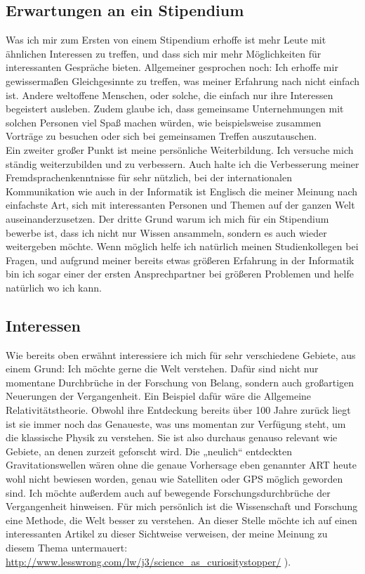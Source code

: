 \documentclass{scrartcl}
\begin{document}
\subsection*{Erwartungen an ein Stipendium}
Was ich mir zum Ersten von einem Stipendium erhoffe ist mehr Leute mit ähnlichen Interessen zu
treffen, und dass sich mir mehr Möglichkeiten für interessanten Gespräche bieten. Allgemeiner
gesprochen noch: Ich erhoffe mir gewissermaßen Gleichgesinnte zu treffen, was meiner Erfahrung
nach nicht einfach ist. Andere weltoffene Menschen, oder solche, die einfach nur ihre Interessen
begeistert ausleben. Zudem glaube ich, dass gemeinsame Unternehmungen mit solchen Personen viel
Spaß machen würden, wie beispielsweise zusammen Vorträge zu besuchen oder sich bei gemeinsamen
Treffen auszutauschen. \\ Ein zweiter großer Punkt ist meine persönliche Weiterbildung. Ich versuche
mich ständig weiterzubilden und zu verbessern.
Auch halte ich die Verbesserung meiner Fremdsprachenkenntnisse für sehr nützlich,
bei der internationalen Kommunikation wie auch in der Informatik ist Englisch die meiner Meinung
nach einfachste Art, sich mit interessanten Personen und Themen auf der ganzen Welt auseinanderzusetzen.
Der dritte Grund warum ich mich für ein Stipendium bewerbe ist, dass ich nicht nur Wissen
ansammeln, sondern es auch wieder weitergeben möchte. Wenn möglich helfe ich natürlich meinen
Studienkollegen bei Fragen, und aufgrund meiner bereits etwas größeren Erfahrung in der Informatik
bin ich sogar einer der ersten Ansprechpartner bei größeren Problemen und helfe natürlich wo ich kann.

\subsection*{Interessen}
Wie bereits oben erwähnt interessiere ich mich für sehr verschiedene Gebiete, aus einem Grund:
Ich möchte gerne die Welt verstehen. Dafür sind nicht nur momentane Durchbrüche in der Forschung
von Belang, sondern auch großartigen Neuerungen der Vergangenheit. Ein Beispiel dafür wäre die
Allgemeine Relativitätstheorie. Obwohl ihre Entdeckung bereits über 100 Jahre zurück liegt ist
sie immer noch das Genaueste, was uns momentan zur Verfügung steht, um die klassische Physik
zu verstehen. Sie ist also durchaus genauso relevant wie Gebiete, an denen zurzeit geforscht
wird. Die „neulich“ entdeckten Gravitationswellen wären ohne die genaue Vorhersage eben genannter
ART heute wohl nicht bewiesen worden, genau wie Satelliten oder GPS möglich geworden sind.
Ich möchte außerdem auch auf bewegende Forschungsdurchbrüche der Vergangenheit hinweisen. Für mich
persönlich ist die Wissenschaft und Forschung eine Methode, die Welt besser zu verstehen.
An dieser Stelle möchte ich auf einen interessanten Artikel zu dieser Sichtweise
verweisen, der meine Meinung zu diesem Thema untermauert:
\url{http://www.lesswrong.com/lw/j3/science\_as\_curiositystopper/}
).
\end{document}
